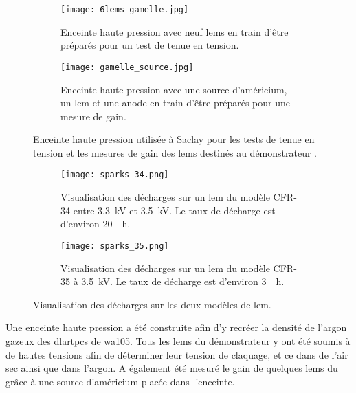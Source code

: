       \begin{figure}[!htb]
        \begin{subfigure}[t]{0.48\textwidth}
          \texttt{[image: 6lems\_gamelle.jpg]}
          \caption{\label{fig::6lems_gamelle}Enceinte haute pression avec neuf \glspl{lem} en train d'être préparés pour un test de tenue en tension.}
        \end{subfigure}
        \hfill
        \begin{subfigure}[t]{0.48\textwidth}
          \texttt{[image: gamelle\_source.jpg]}
          \caption{\label{fig::gamelle_source}Enceinte haute pression avec une source d'américium, un \gls{lem} et une anode en train d'être préparés pour une mesure de gain.}
        \end{subfigure}
        \caption[Enceinte haute pression]{\label{fig::gamelle}Enceinte haute pression utilisée à Saclay pour les tests de tenue en tension et les mesures de gain des \glspl{lem} destinés au démonstrateur \SSS{}.}
      \end{figure}

      \begin{figure}[!htb]
        \begin{subfigure}[t]{0.48\textwidth}
          \centering
          \texttt{[image: sparks\_34.png]}
          \caption{\label{fig::sparks_34}Visualisation des décharges sur un \gls{lem} du modèle CFR-34 entre \SI{3.3}{\kilo\volt} et \SI{3.5}{\kilo\volt}. Le taux de décharge est d'environ \SI{20}{\per\hour}.}
        \end{subfigure}
        \hfill
        \begin{subfigure}[t]{0.48\textwidth}
          \centering
          \texttt{[image: sparks\_35.png]}
          \caption{\label{fig::sparks_35}Visualisation des décharges sur un \gls{lem} du modèle CFR-35 à \SI{3.5}{\kilo\volt}. Le taux de décharge est d'environ \SI{3}{\per\hour}.}
        \end{subfigure}
        \caption[Visualisation des décharges sur les deux modèles de LEM]{\label{fig::sparks}Visualisation des décharges sur les deux modèles de \gls{lem}.}
      \end{figure}

      Une enceinte haute pression a été construite afin d'y recréer la densité de l'argon gazeux des \glspl{dlartpc} de \gls{wa105}. Tous les \glspl{lem} du démonstrateur \SSS{} y ont été soumis à de hautes tensions afin de déterminer leur tension de claquage, et ce dans de l'air sec ainsi que dans l'argon. A également été mesuré le gain de quelques \glspl{lem} du \SSS{} grâce à une source d'américium placée dans l'enceinte.
            
